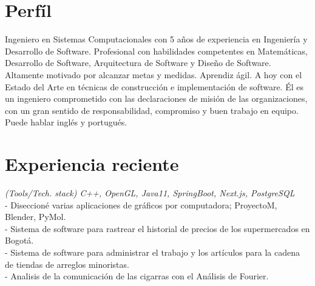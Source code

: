 \documentclass[]{CV-JuanCamiloFlorez}
\begin{document}
\begin{minipage}[t]{0.66\textwidth} 


\section{Perfíl}
Ingeniero en Sistemas Computacionales con 5 años de experiencia en Ingeniería y Desarrollo de Software. Profesional con habilidades competentes en Matemáticas, Desarrollo de Software, Arquitectura de Software y Diseño de Software. Altamente motivado por alcanzar metas y medidas. Aprendiz ágil. A hoy con el Estado del Arte en técnicas de construcción e implementación de software. Él es un ingeniero comprometido con las declaraciones de misión de las organizaciones, con un gran sentido de responsabilidad, compromiso y buen trabajo en equipo. Puede hablar inglés y portugués.


\sectionsep

\section{Experiencia reciente}
    \textit{(Tools/Tech. stack) C++, OpenGL, Java11, SpringBoot, Next.js, PostgreSQL} \\
        - Diseccioné varias aplicaciones de gráficos por computadora; ProyectoM, Blender, PyMol. \\
        - Sistema de software para rastrear el historial de precios de los supermercados en Bogotá. \\
        - Sistema de software para administrar el trabajo y los artículos para la cadena de tiendas de arreglos minoristas. \\
        - Analisis de la comunicación de las cigarras con el Análisis de Fourier. \\
        \sectionsep


\end{minipage}
\end{document}
